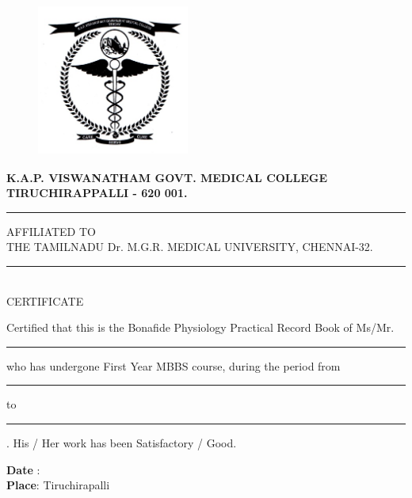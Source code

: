 \documentclass[a4paper,12pt,openany,oneside]{book}
\begin{document}
\newpage
\vspace*{\fill}
\begin{center}
\begin{figure}[H]
	\centering
	\includegraphics[height=5cm,width=5cm]{./collegeEmblem/collegeEmblem.jpg}
\end{figure}
	\textbf{\Huge {K.A.P. VISWANATHAM GOVT. MEDICAL COLLEGE}}\\
	\textbf{\Large{TIRUCHIRAPPALLI - 620 001.}}\\

	\rule{4in}{0.5pt}
	\parbox{3.9in}{\centering AFFILIATED TO\\ THE TAMILNADU Dr. M.G.R. MEDICAL UNIVERSITY, CHENNAI-32.}
	\rule{4in}{0.5pt}\\
	{\centering \LARGE{CERTIFICATE\\}}
\end{center}
	\par
	{\large{
	Certified that this is the Bonafide Physiology Practical Record Book of Ms/Mr. \rule{3.5in}{.5pt}who has undergone First Year MBBS course, during the period from \rule{1in}{.5pt} to \rule{1in}{.5pt}.  His / Her work has been Satisfactory / Good.\\
	}
	}


\begin{table}[H]
 \renewcommand{\arraystretch}{.6} \centering
 \end{table}

\noindent \textbf{Date} :\\
\textbf{Place}: Tiruchirapalli\\
\vspace*{\fill}
\end{document}
